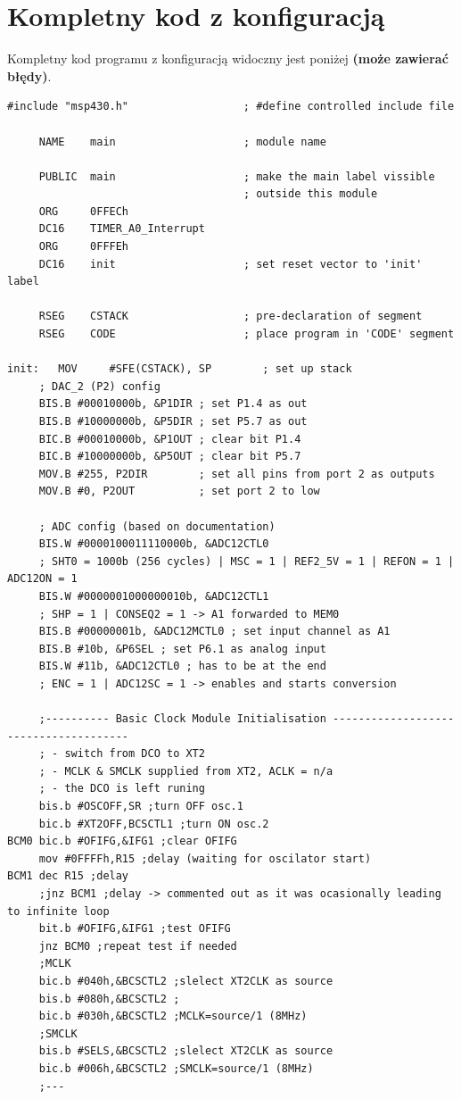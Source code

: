 \documentclass{article}
\begin{document}
\section{Kompletny kod z konfiguracją}
Kompletny kod programu z konfiguracją widoczny jest poniżej \textbf{(może zawierać błędy)}.
\newpage
\begin{verbatim}
#include "msp430.h"                  ; #define controlled include file
 
     NAME    main                    ; module name

     PUBLIC  main                    ; make the main label vissible
                                     ; outside this module
     ORG     0FFECh
     DC16    TIMER_A0_Interrupt
     ORG     0FFFEh                  
     DC16    init                    ; set reset vector to 'init' label

     RSEG    CSTACK                  ; pre-declaration of segment
     RSEG    CODE                    ; place program in 'CODE' segment

init:   MOV     #SFE(CSTACK), SP        ; set up stack
     ; DAC_2 (P2) config
     BIS.B #00010000b, &P1DIR ; set P1.4 as out
     BIS.B #10000000b, &P5DIR ; set P5.7 as out
     BIC.B #00010000b, &P1OUT ; clear bit P1.4
     BIC.B #10000000b, &P5OUT ; clear bit P5.7
     MOV.B #255, P2DIR        ; set all pins from port 2 as outputs
     MOV.B #0, P2OUT          ; set port 2 to low

     ; ADC config (based on documentation)
     BIS.W #0000100011110000b, &ADC12CTL0
     ; SHT0 = 1000b (256 cycles) | MSC = 1 | REF2_5V = 1 | REFON = 1 | ADC12ON = 1
     BIS.W #0000001000000010b, &ADC12CTL1
     ; SHP = 1 | CONSEQ2 = 1 -> A1 forwarded to MEM0
     BIS.B #00000001b, &ADC12MCTL0 ; set input channel as A1
     BIS.B #10b, &P6SEL ; set P6.1 as analog input
     BIS.W #11b, &ADC12CTL0 ; has to be at the end
     ; ENC = 1 | ADC12SC = 1 -> enables and starts conversion

     ;---------- Basic Clock Module Initialisation --------------------------------------
     ; - switch from DCO to XT2
     ; - MCLK & SMCLK supplied from XT2, ACLK = n/a
     ; - the DCO is left runing
     bis.b #OSCOFF,SR ;turn OFF osc.1
     bic.b #XT2OFF,BCSCTL1 ;turn ON osc.2
BCM0 bic.b #OFIFG,&IFG1 ;clear OFIFG
     mov #0FFFFh,R15 ;delay (waiting for oscilator start)
BCM1 dec R15 ;delay
     ;jnz BCM1 ;delay -> commented out as it was ocasionally leading to infinite loop
     bit.b #OFIFG,&IFG1 ;test OFIFG
     jnz BCM0 ;repeat test if needed
     ;MCLK
     bic.b #040h,&BCSCTL2 ;slelect XT2CLK as source
     bis.b #080h,&BCSCTL2 ;
     bic.b #030h,&BCSCTL2 ;MCLK=source/1 (8MHz)
     ;SMCLK
     bis.b #SELS,&BCSCTL2 ;slelect XT2CLK as source
     bic.b #006h,&BCSCTL2 ;SMCLK=source/1 (8MHz)
     ;---


\end{verbatim}
\end{document}
